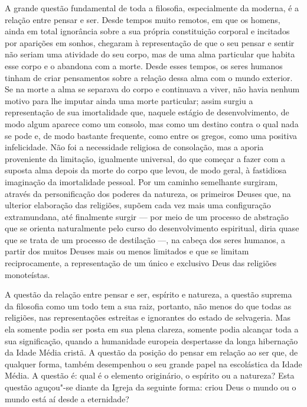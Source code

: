 \noindent{}A grande questão fundamental de toda a filosofia, especialmente da %
moderna, é a relação entre pensar e ser. Desde tempos muito
remotos, em que os homens, ainda em total ignorância sobre a sua própria
constituição corporal e incitados por aparições em sonhos,
chegaram à representação de que o seu pensar e sentir não seriam uma
atividade do seu corpo, mas de uma alma particular que habita esse
corpo e o abandona com a morte. Desde esses tempos, os seres humanos
tinham de criar pensamentos sobre a relação dessa alma com o mundo
exterior. Se na morte a alma se separava do corpo e continuava a viver,
não havia nenhum motivo para lhe imputar ainda uma morte particular;
assim surgiu a representação de sua imortalidade que, naquele estágio de
desenvolvimento, de modo algum aparece como um consolo, mas como um
destino contra o qual nada se pode e, de modo bastante frequente, como
entre os gregos, como uma positiva infelicidade. Não foi a necessidade
religiosa de consolação, mas a aporia proveniente 
da limitação, igualmente universal, do que começar a fazer com a suposta
alma depois da morte do corpo que levou, de modo geral, à fastidiosa
imaginação da imortalidade pessoal. Por um caminho semelhante surgiram,
através da personificação dos poderes da natureza, os primeiros Deuses
que, na ulterior elaboração das religiões, supõem cada vez mais uma
configuração extramundana, até finalmente surgir --- por meio de um processo
de abstração que se orienta naturalmente pelo curso do desenvolvimento
espiritual, diria quase que se trata de um processo de destilação ---,
na cabeça dos seres humanos, a partir dos muitos Deuses mais ou menos
limitados e que se limitam reciprocamente, a representação de um único e
exclusivo Deus das religiões monoteístas. %

A questão da relação entre pensar e ser, espírito e natureza, a questão
suprema da filosofia como um todo tem a sua raiz, portanto, não menos
do que todas as religiões, nas representações estreitas e ignorantes do
estado de selvageria. Mas ela somente podia ser posta em sua plena
clareza, somente podia alcançar toda a sua significação, quando a
humanidade europeia despertasse da longa hibernação da Idade Média
cristã. A questão da posição do pensar em relação ao ser que, de
qualquer forma, também desempenhou o seu grande papel na escolástica da
Idade Média. A questão é: qual é o elemento originário, o espírito ou a
natureza? Esta questão aguçou"-se diante da Igreja da seguinte forma:
criou Deus o mundo ou o mundo está aí desde a eternidade?

